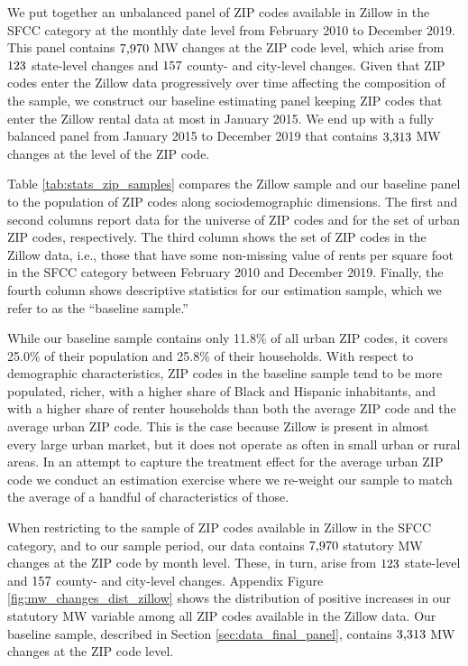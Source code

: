 We put together an unbalanced panel of ZIP codes available in Zillow in the SFCC 
category at the monthly date level from February 2010 to December 2019.
This panel contains $\textnormal{7,970}$ MW changes at the ZIP code level, 
which arise from $\textnormal{123}$ state-level changes and 
$\textnormal{157}$ county- and city-level changes.
Given that ZIP codes enter the Zillow data progressively over time affecting 
the composition of the sample,
we construct our baseline estimating panel keeping ZIP codes that enter the 
Zillow rental data at most in January 2015.
We end up with a fully balanced panel from January 2015 to December 2019
that contains $\textnormal{3,313}$ MW changes at the level of the ZIP code.

Table \ref{tab:stats_zip_samples} compares the Zillow sample and our baseline 
panel to the population of ZIP codes along sociodemographic dimensions. 
The first and second columns report data for the universe of ZIP codes and 
for the set of urban ZIP codes, respectively.
The third column shows the set of ZIP codes in the Zillow data, i.e., those 
that have some non-missing value of rents per square foot in the SFCC category 
between February 2010 and December 2019.
Finally, the fourth column shows descriptive statistics for our estimation 
sample, which we refer to as the ``baseline sample.''

While our baseline sample contains only 11.8\% of all urban ZIP codes, it covers
25.0\% of their population and 25.8\% of their households.
With respect to demographic characteristics, ZIP codes in the baseline sample 
tend to be more populated, richer, with a higher share of Black and Hispanic 
inhabitants, and with a higher share of renter households than both 
the average ZIP code and the average urban ZIP code.
This is the case because Zillow is present in almost every large urban market, 
but it does not operate as often in small urban or rural areas.
In an attempt to capture the treatment effect for the average urban ZIP code 
we conduct an estimation exercise where we re-weight our sample to match the 
average of a handful of characteristics of those.

When restricting 
to the sample of ZIP codes available in Zillow in the SFCC category, and 
to our sample period, our data contains
$\textnormal{7,970}$ statutory MW changes at the ZIP code by month level.
These, in turn, arise from 
$\textnormal{123}$ state-level and 
$\textnormal{157}$ county- and city-level changes.
Appendix Figure \ref{fig:mw_changes_dist_zillow} shows the distribution of 
positive increases in our statutory MW variable among all ZIP codes available 
in the Zillow data.
Our baseline sample, described in Section \ref{sec:data_final_panel}, 
contains $\textnormal{3,313}$ MW changes at the ZIP code level.


